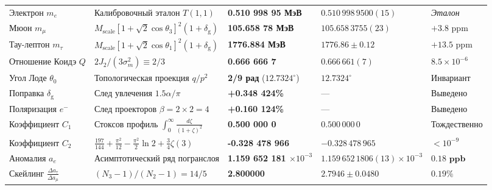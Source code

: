\documentclass[11pt,a4paper]{article}
\theoremstyle{definition}
\theoremstyle{remark}
\begin{document}
\begin{xltabular}{\textwidth}{>{\raggedright\arraybackslash}p{3.2cm} X >{\centering\arraybackslash}p{2.7cm} >{\centering\arraybackslash}p{3.0cm} >{\raggedleft\arraybackslash}p{2.1cm}}
 \\
\midrule
Электрон $m_e$ & Калибровочный эталон $T(1,1)$ & \textbf{0.510 998 95 МэВ} & $0.510\,998\,9500(15)$ & \textit{Эталон} \\
Мюон $m_\mu$ & $M_{\mathrm{scale}} [1+\sqrt{2}\cos\theta_3]^2 (1+\delta_{\mathrm{g}})$ & \textbf{105.658 78 МэВ} & $105.658\,3755(23)$ & $+3.8\text{ ppm}$ \\
Тау-лептон $m_\tau$ & $M_{\mathrm{scale}} [1+\sqrt{2}\cos\theta_1]^2 (1+\delta_{\mathrm{g}})$ & \textbf{1776.884 МэВ} & $1776.86 \pm 0.12$ & $+13.5\text{ ppm}$ \\
Отношение Коидэ $Q$ & $2 J_2 / (3 \sigma_m^2) \equiv 2/3$ & \textbf{0.666 666 7} & $0.666\,661(7)$ & $8.5 \times 10^{-6}$ \\
Угол Лоде $\theta_0$ & Топологическая проекция $q/p^2$ & \textbf{2/9 рад} ($12.7324^\circ$) & $12.7324^\circ$ & Инвариант \\
Поправка $\delta_{\mathrm{g}}$ & След увлечения $1.5\alpha/\pi$ & \textbf{+0.348 424\%} & --- & Выведено \\
Поляризация $e^-$ & След проекторов $\beta = 2 \times 2 = 4$ & \textbf{+0.160 124\%} & --- & Выведено \\
Коэффициент $C_1$ & Стоксов профиль $\int_0^\infty \frac{d\zeta}{(1+\zeta)^2}$ & \textbf{0.500 000 0} & $0.500\,000\,0$ & Тождественно \\
Коэффициент $C_2$ & $\frac{197}{144} + \frac{\pi^2}{12} - \frac{\pi^2}{2}\ln 2 + \frac{3}{4}\zeta(3)$ & \textbf{-0.328 478 966} & $-0.328\,478\,965$ & $< 10^{-9}$ \\
Аномалия $a_e$ & Асимптотический ряд погранслоя & \textbf{1.159 652 181 $\times 10^{-3}$} & $1.159\,652\,1806(13)\times 10^{-3}$ & $\mathbf{0.18\text{ ppb}}$ \\
Скейлинг $\frac{\Delta a_\tau}{\Delta a_\mu}$ & $(N_3 - 1)/(N_2 - 1) = 14/5$ & \textbf{2.800000} & $2.7946 \pm 0.0480$ & $0.19\%$ \\
\midrule


\end{xltabular}
\end{document}

